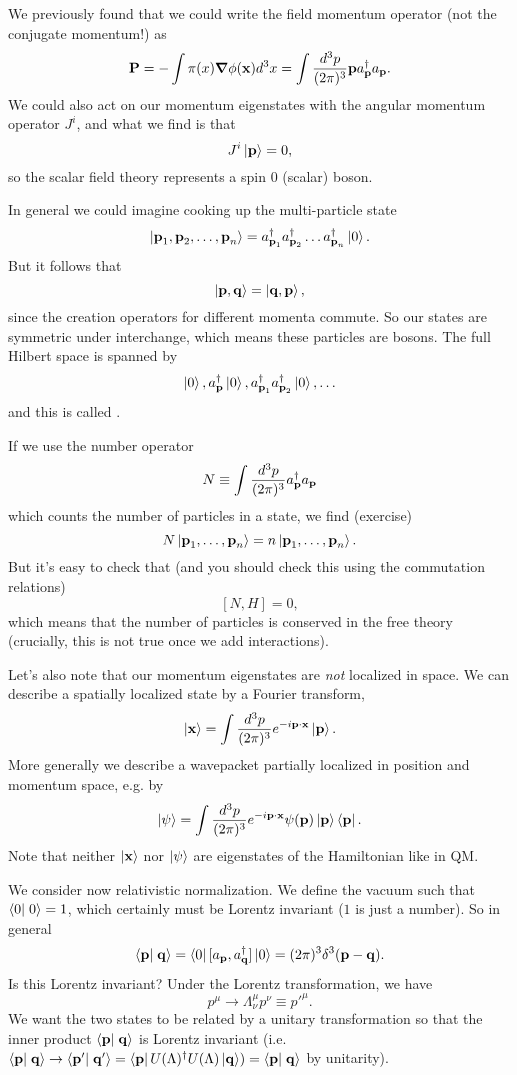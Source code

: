 We previously found that we could write the field momentum operator (not the conjugate momentum!) as
$$\boldsymbol{\mathbf{P}}=-\int \pi(x) \mbox{\boldmath$ \nabla $} \phi(\boldsymbol{\mathbf{x}}) d^3x = \int \frac{d^3p}{(2\pi)^3} \boldsymbol{\mathbf{ p}} a_{\boldsymbol{\mathbf{p}}}^\dagger a_{\boldsymbol{\mathbf{p}}}.$$
We could also act on our momentum eigenstates with the angular momentum operator $J^i$, and what we find is that 
$$J^i\left| \boldsymbol{\mathbf{p}} \right>=0,$$
so the scalar field theory represents a spin $0$ (scalar) boson.

In general we could imagine cooking up the multi-particle state
$$\left| \boldsymbol{\mathbf{p}}_1,\boldsymbol{\mathbf{p}}_2,\ldots,\boldsymbol{\mathbf{p}}_n \right>=a_{\boldsymbol{\mathbf{p}}_1}^\dagger a_{\boldsymbol{\mathbf{p}}_2}^\dagger \ldots a_{\boldsymbol{\mathbf{p}}_n}^\dagger \left| 0 \right>.$$
But it follows that
$$\left| \boldsymbol{\mathbf{p}}, \boldsymbol{\mathbf{q}} \right>=\left| \boldsymbol{\mathbf{q}},\boldsymbol{\mathbf{p}} \right>,$$
since the creation operators for different momenta commute. So our states are symmetric under interchange, which means these particles are bosons. The full Hilbert space is spanned by
$$\left| 0 \right>,a_{\boldsymbol{\mathbf{p}}}^\dagger \left| 0 \right>, a_{\boldsymbol{\mathbf{p}}_1}^\dagger a_{\boldsymbol{\mathbf{p}}_2}^\dagger\left| 0 \right>, \ldots$$
and this is called .

If we use the number operator
$$N\equiv \int \frac{d^3p}{(2\pi)^3} a_{\boldsymbol{\mathbf{p}}}^\dagger a_{\boldsymbol{\mathbf{p}}}$$
which counts the number of particles in a state, we find (exercise)
$$N\left| \boldsymbol{\mathbf{p}}_1, \ldots ,\boldsymbol{\mathbf{p}}_n \right>=n \left| \boldsymbol{\mathbf{p}}_1, \ldots ,\boldsymbol{\mathbf{p}}_n \right>.$$
But it's easy to check that (and you should check this using the commutation relations) $$[N,H]=0,$$
which means that the number of particles is conserved in the free theory (crucially, this is not true once we add interactions).

Let's also note that our momentum eigenstates are \emph{not} localized in space. We can describe a spatially localized state by a Fourier transform,
$$\left| \boldsymbol{\mathbf{x}} \right> = \int \frac{d^3 p}{(2\pi)^3} e^{-i \boldsymbol{\mathbf{p}} \cdot \boldsymbol{\mathbf{x}}} \left| \boldsymbol{\mathbf{p}} \right>.$$
More generally we describe a wavepacket partially localized in position and momentum space, e.g. by 
$$\left| \psi \right> = \int\frac{d^3p}{(2\pi)^3} e^{-i\boldsymbol{\mathbf{p}} \cdot \boldsymbol{\mathbf{x}}} \psi(\boldsymbol{\mathbf{p}})\left| \boldsymbol{\mathbf{p}} \right>\left< \boldsymbol{\mathbf{p}} \right|.$$
Note that neither $\left| \boldsymbol{\mathbf{x}} \right>$ nor $\left| \psi \right>$ are eigenstates of the Hamiltonian like in QM.

We consider now relativistic normalization. We define the vacuum such that $\braket{0}{0}=1$, which certainly must be Lorentz invariant ($1$ is just a number). So in general 
$$\braket{\vec p}{\vec q}=\bra{0}[a_{\pv},a_{\vec q}^\dagger] \ket{0}=(2\pi)^3 \delta^3(\vec p - \vec q).$$
Is this Lorentz invariant? Under the Lorentz transformation, we have $$p^\mu \to \Lambda^\mu_\nu p^\nu \equiv {p'}^\mu.$$
We want the two states to be related by a unitary transformation so that the inner product $\braket{\vec p}{\vec q}$ is Lorentz invariant (i.e. $\braket{\vec p}{\vec q}\to \braket{\vec p'}{\vec q'}=\bra{\pv}U(\Lambda)^\dagger U(\Lambda)\ket{\vec q})=\braket{\vec p}{\vec q}$ by unitarity).

